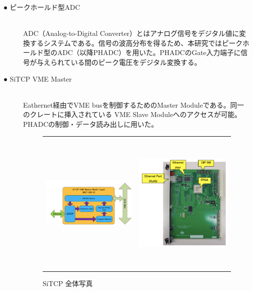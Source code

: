 \documentclass[a4paper,11pt,dvipdfmx]{jsarticle}
\begin{document}
\newpage
\begin{description}
   \item[● ピークホールド型ADC]\mbox{}\\
   ADC（Analog-to-Digital Converter）とはアナログ信号をデジタル値に変換するシステムである。信号の波高分布を得るため、本研究ではピークホールド型のADC（以降PHADC）を用いた。PHADCのGate入力端子に信号が与えられている間のピーク電圧をデジタル変換する。\\

   \item[● SiTCP VME Master]\mbox{}\\
   Eathernet経由でVME busを制御するためのMaster Moduleである。同一のクレートに挿入されている VME Slave Moduleへのアクセスが可能。PHADCの制御・データ読み出しに用いた。
   
\vspace*{5mm}
   
 \begin{figure}[H]
    \begin{tabular}{cc}
      \begin{minipage}[t]{0.45\hsize}
        \centering
        \includegraphics[width=62mm,height=50mm]{picture/daq/SiTCP.png}
        \caption{SiTCP 全体ブロック図\cite{BBT}}
        \label{SiTCP1}
      \end{minipage} &
      \begin{minipage}[t]{0.45\hsize}
        \centering
        \includegraphics[width=64mm,height=70mm]{picture/daq/SiTCP2.png}
        \caption{SiTCP 全体写真\cite{BBT}}
        \label{SiTCP2}
      \end{minipage}
    \end{tabular}
  \end{figure}
  
\end{description}
\end{document}
